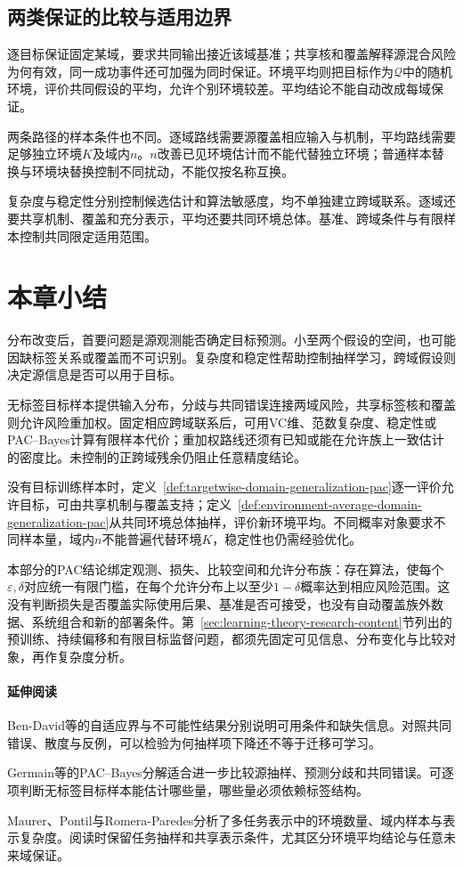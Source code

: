 \subsection{两类保证的比较与适用边界}
\label{sec:dg-guarantee-comparison}

逐目标保证固定某域，要求共同输出接近该域基准；共享核和覆盖解释源混合风险为何有效，同一成功事件还可加强为同时保证。环境平均则把目标作为$\mathcal Q$中的随机环境，评价共同假设的平均，允许个别环境较差。平均结论不能自动改成每域保证。

两条路径的样本条件也不同。逐域路线需要源覆盖相应输入与机制，平均路线需要足够独立环境$K$及域内$n$。$n$改善已见环境估计而不能代替独立环境；普通样本替换与环境块替换控制不同扰动，不能仅按名称互换。

复杂度与稳定性分别控制候选估计和算法敏感度，均不单独建立跨域联系。逐域还要共享机制、覆盖和充分表示，平均还要共同环境总体。基准、跨域条件与有限样本控制共同限定适用范围。

\section{本章小结}
\label{sec:transfer-learning-summary}

分布改变后，首要问题是源观测能否确定目标预测。小至两个假设的空间，也可能因缺标签关系或覆盖而不可识别。复杂度和稳定性帮助控制抽样学习，跨域假设则决定源信息是否可以用于目标。

无标签目标样本提供输入分布，分歧与共同错误连接两域风险，共享标签核和覆盖则允许风险重加权。固定相应跨域联系后，可用VC维、范数复杂度、稳定性或PAC--Bayes计算有限样本代价；重加权路线还须有已知或能在允许族上一致估计的密度比。未控制的正跨域残余仍阻止任意精度结论。

没有目标训练样本时，定义~\ref{def:targetwise-domain-generalization-pac}逐一评价允许目标，可由共享机制与覆盖支持；定义~\ref{def:environment-average-domain-generalization-pac}从共同环境总体抽样，评价新环境平均。不同概率对象要求不同样本量，域内$n$不能普遍代替环境$K$，稳定性也仍需经验优化。

本部分的PAC结论绑定观测、损失、比较空间和允许分布族：存在算法，使每个$\varepsilon,\delta$对应统一有限门槛，在每个允许分布上以至少$1-\delta$概率达到相应风险范围。这没有判断损失是否覆盖实际使用后果、基准是否可接受，也没有自动覆盖族外数据、系统组合和新的部署条件。第~\ref{sec:learning-theory-research-content}节列出的预训练、持续偏移和有限目标监督问题，都须先固定可见信息、分布变化与比较对象，再作复杂度分析。

\paragraph{延伸阅读}
Ben-David等的自适应界与不可能性结果分别说明可用条件和缺失信息。对照共同错误、散度与反例，可以检验为何抽样项下降还不等于迁移可学习。

Germain等的PAC--Bayes分解适合进一步比较源抽样、预测分歧和共同错误。可逐项判断无标签目标样本能估计哪些量，哪些量必须依赖标签结构。

Maurer、Pontil与Romera-Paredes分析了多任务表示中的环境数量、域内样本与表示复杂度。阅读时保留任务抽样和共享表示条件，尤其区分环境平均结论与任意未来域保证。